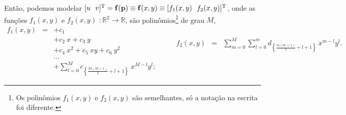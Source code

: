 \begin{theorem}
Então, podemos modelar  
$[u~~v]^{\transpose} = \VECTOR{f}(\VECTOR{p})\equiv \VECTOR{f}(x,y)\equiv [f_1(x,y)~~f_2(x,y) ]^{\transpose}$, 
onde as funções $f_1(x,y)$ e $f_2(x,y)$ $: \mathbb{R}^2 \rightarrow \mathbb{R}$,
são polinômios\footnote{Os polinômios $f_1(x,y)$ e $f_2(x,y)$ são semelhantes, só a notação na escrita foi diferente.} de grau $M$,
\begin{equation}\label{eq:mapeamento:2}
\begin{matrix}
f_1(x,y) & = & +c_{1}\\
              ~ & ~ & +c_{2}~x + c_{3}~y\\
              ~ & ~ & +c_{4}~x^2 +c_{5}~xy + c_{6}~y^2\\
              ~ & ~ &  ...\\
              ~ & ~ & +\sum \limits_{l=0}^{M}c_{\left\{ \frac{M(M+1)}{2}+l+1\right\}}~x^{M-l}y^{l};
\end{matrix} 
\qquad
\begin{matrix}
f_2(x,y) & = & \sum \limits_{m=0}^{M} \sum \limits_{l=0}^{m}d_{\left\{ \frac{m(m+1)}{2}+l+1\right\}}~x^{m-l}y^{l}.
       ~ & ~ & ~\\
       ~ & ~ & ~\\
       ~ & ~ & ~\\
       ~ & ~ & ~\\
       ~ & ~ & ~
\end{matrix}
\end{equation}


\end{theorem}
